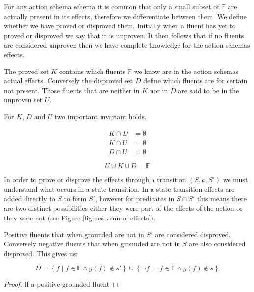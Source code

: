 \documentclass[../Master.tex]{subfiles}
\begin{document}
For any action schema schema it is common that only a small subset of $\mathbb{F}$ are actually present in its effects, 
therefore we differentiate between them. 
We define whether we have proved or disproved them. 
Initially when a fluent has yet to proved or disproved we say that it is unproven. 
It then follows that if no fluents are considered unproven then we have complete knowledge for the action schemas effects.


\begin{definition} 
	The proved set $K$ contains which fluents $\mathbb{F}$ we know are in the action schemas actual effects.
	Conversely the disproved set $D$ define which fluents are for certain not present.
	Those fluents that are neither in $K$ nor in $D$ are said to be in the unproven set $U$.
	
\end{definition}

For $K$, $D$ and $U$ two important invariant holds.

\begin{invariant}
	\begin{equation*}
		\begin{split}
		K \cap D & = \emptyset  \\ 
		K \cap U &= \emptyset \\
		D \cap U &= \emptyset
		\end{split}
	\end{equation*}
\end{invariant}

\begin{invariant}[Completeness]
	\begin{equation*}
		U \cup K \cup D = \mathbb{F}
	\end{equation*}
\end{invariant}

In order to prove or disprove the effects through a transition $(S,a,S')$ we must understand what occurs in a state transition.
In a state transition effects are added directly to $S$ to form $S'$, however for predicates in $S \cap S'$ this means there are two distinct possibilities either they were part of the effects of the action or they were not (see Figure \ref{fig:nca:venn-of-effects}).


\begin{theorem}
	Positive fluents that when grounded are not in $S'$ are considered disproved. Conversely negative fluents that when grounded are not in $S$ are also considered disproved. This gives us:
	
	\begin{equation*}
		D = \left\{
			f \; | \; f \in \mathbb{F} \land g(f) \notin s'
			\right\} 
			\cup
			 \left\{
			\neg f \; | \; \neg f \in \mathbb{F} \land g(f) \notin s
			\right\}
	\end{equation*}
	\begin{proof} If a positive grounded  fluent   \qedhere
	\end{proof}
\end{theorem}
\end{document}
